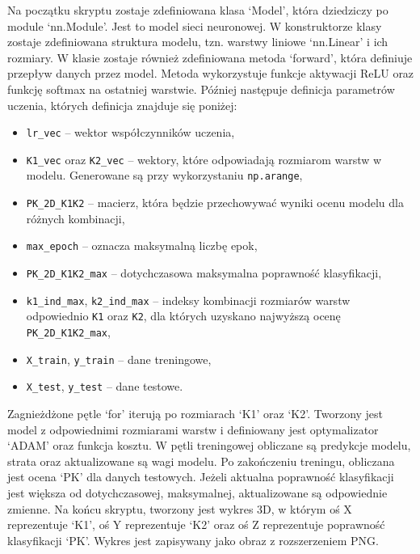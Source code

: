 \documentclass{article}
\begin{document}
Na początku skryptu zostaje zdefiniowana klasa `Model', która dziedziczy po module `nn.Module'.
Jest to model sieci neuronowej.
W konstruktorze klasy zostaje zdefiniowana struktura modelu, tzn. warstwy liniowe `nn.Linear' i ich rozmiary.
W klasie zostaje również zdefiniowana metoda `forward', która definiuje przepływ danych przez model.
Metoda wykorzystuje funkcje aktywacji ReLU oraz funkcję softmax na ostatniej warstwie.
Później następuje definicja parametrów uczenia, których definicja znajduje się poniżej:

\begin{itemize}
    \item \texttt{lr\_vec} -- wektor współczynników uczenia,
    \item \texttt{K1\_vec} oraz \texttt{K2\_vec} -- wektory, które odpowiadają rozmiarom warstw w modelu. Generowane są przy wykorzystaniu \texttt{np.arange},
    \item \texttt{PK\_2D\_K1K2} -- macierz, która będzie przechowywać wyniki ocenu modelu dla różnych kombinacji,
    \item \texttt{max\_epoch} -- oznacza maksymalną liczbę epok,
    \item \texttt{PK\_2D\_K1K2\_max} -- dotychczasowa maksymalna poprawność klasyfikacji,
    \item \texttt{k1\_ind\_max}, \texttt{k2\_ind\_max} -- indeksy kombinacji rozmiarów warstw odpowiednio \texttt{K1} oraz \texttt{K2}, dla których uzyskano najwyższą ocenę \texttt{PK\_2D\_K1K2\_max},
    \item \texttt{X\_train}, \texttt{y\_train} -- dane treningowe,
    \item \texttt{X\_test}, \texttt{y\_test} -- dane testowe.
\end{itemize}

Zagnieżdżone pętle `for' iterują po rozmiarach `K1' oraz `K2'.
Tworzony jest model z odpowiednimi rozmiarami warstw i definiowany jest optymalizator `ADAM' oraz funkcja kosztu.
W pętli treningowej obliczane są predykcje modelu, strata oraz aktualizowane są wagi modelu.
Po zakończeniu treningu, obliczana jest ocena `PK' dla danych testowych.
Jeżeli aktualna poprawność klasyfikacji jest większa od dotychczasowej, maksymalnej, aktualizowane są odpowiednie zmienne.
Na końcu skryptu, tworzony jest wykres 3D, w którym oś X reprezentuje `K1', oś Y reprezentuje `K2' oraz oś Z reprezentuje poprawność klasyfikacji `PK'.
Wykres jest zapisywany jako obraz z rozszerzeniem PNG.
\end{document}
